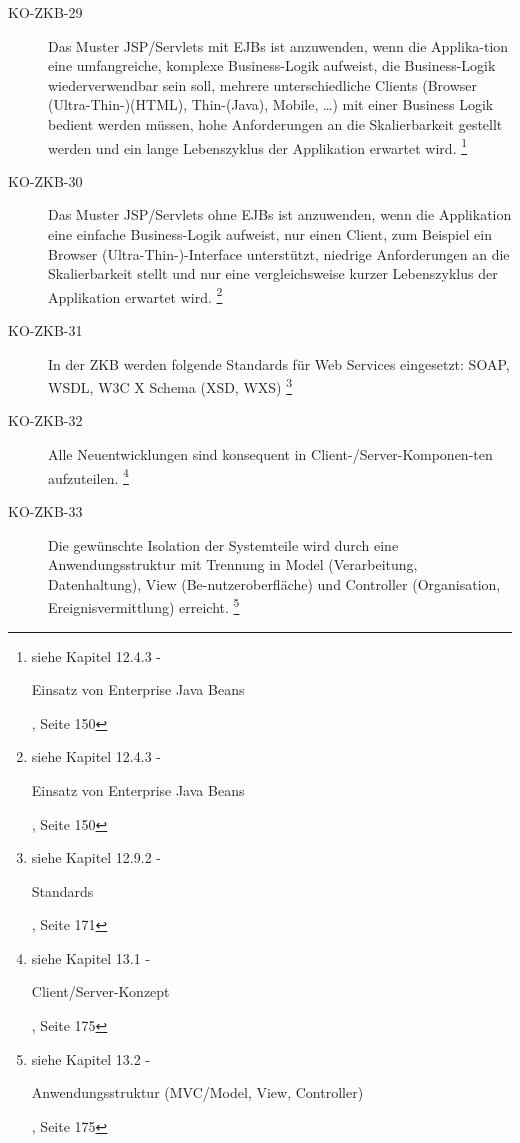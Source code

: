 \documentclass[abstracton, listof=totocnumbered,
bibliography=totocnumbered]{scrreprt}
\begin{document}
\begin{description}
    \item[KO-ZKB-29] Das Muster JSP/Servlets mit EJBs ist anzuwenden, wenn die
    Applika-tion eine umfangreiche, komplexe Business-Logik aufweist, die
    Business-Logik wiederverwendbar sein soll, mehrere unterschiedliche Clients
    (Browser (Ultra-Thin-)(HTML), Thin-(Java), Mobile, …) mit einer Business
    Logik bedient werden müssen, hohe Anforderungen an die Skalierbarkeit
    gestellt werden und ein lange Lebenszyklus der Applikation erwartet wird.
    \footnote{siehe Kapitel 12.4.3 -
    \begin{itshape}Einsatz von Enterprise Java Beans\end{itshape}, Seite 150}
    
    \item[KO-ZKB-30] Das Muster JSP/Servlets ohne EJBs ist anzuwenden, wenn die
    Applikation eine einfache Business-Logik aufweist, nur einen Client, zum
    Beispiel ein Browser (Ultra-Thin-)-Interface unterstützt, niedrige
    Anforderungen an die Skalierbarkeit stellt und nur eine vergleichsweise
    kurzer Lebenszyklus der Applikation erwartet wird.
    \footnote{siehe Kapitel 12.4.3 -
    \begin{itshape}Einsatz von Enterprise Java Beans\end{itshape}, Seite 150}
    
    \item[KO-ZKB-31] In der ZKB werden folgende Standards für Web Services
    eingesetzt: SOAP, WSDL, W3C X Schema (XSD, WXS)
    \footnote{siehe Kapitel 12.9.2 -
    \begin{itshape}Standards\end{itshape}, Seite 171}
    
    \item[KO-ZKB-32] Alle Neuentwicklungen sind konsequent in
    Client-/Server-Komponen-ten aufzuteilen.
    \footnote{siehe Kapitel 13.1 -
    \begin{itshape}Client/Server-Konzept\end{itshape}, Seite 175}
    
    \item[KO-ZKB-33] Die gewünschte Isolation der Systemteile wird durch
    eine Anwendungsstruktur mit Trennung in Model (Verarbeitung,
    Datenhaltung), View (Be-nutzeroberfläche) und Controller (Organisation,
    Ereignisvermittlung) erreicht.
    \footnote{siehe Kapitel 13.2 -
    \begin{itshape}Anwendungsstruktur (MVC/Model, View,
    Controller)\end{itshape}, Seite 175}
    

\end{description}
\end{document}
